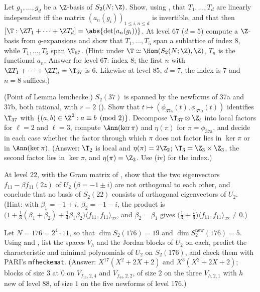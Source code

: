 \begin{exercise}\label{ex:hecke:ex-pairing33}
Let $g_1,\dots,g_d$ be a $\Z$-basis of $S_2(N;\Z)$. Show, using , that $T_1,\dots,T_d$ are linearly independent iff the matrix $(a_n(g_i))_{1\le i,n\le d}$ is
invertible, and that then $[\T:\Z T_1+\cdots+\Z T_d]=\abs{\det(a_n(g_i))}$. At level $67$ ($d=5$) compute a $\Z$-basis from $q$-expansions and show that $T_1,\dots,T_5$ span a sublattice of
index $8$, while $T_1,\dots,T_6$ span $\T_{67}$. (Hint: under $\T\simeq\Hom(S_2(N;\Z),\Z)$, $T_n$ is the functional $a_n$. Answer for level $67$: index $8$; the first $n$ with
$\Z T_1+\cdots+\Z T_n=\T_{67}$ is $6$. Likewise at level $85$, $d=7$, the index is $7$ and $n=8$ suffices.)
\end{exercise}

\begin{exercise}\label{ex:hecke:ex-local}
(Point of Lemma lem:hecke.) $S_2(37)$ is spanned by the newforms of 37a and 37b, both rational, with $r=2$ (). Show that $t\mapsto(\phi_{\text{37a}}(t),\phi_{\text{37b}}(t))$
identifies $\T_{37}$ with $\{(a,b)\in\Z^2:a\equiv b\pmod2\}$. Decompose $\T_{37}\otimes\Z_\ell$ into local factors for $\ell=2$ and $\ell=3$, compute $\Ann(\ker\pi)$ and $\eta(\pi)$ for $\pi=\phi_{\text{37a}}$, and decide in
each case whether the factor through which $\pi$ does not factor lies in $\ker\pi$ or in $\Ann(\ker\pi)$. (Answer: $\T_2$ is local and $\eta(\pi)=2\Z_2$; $\T_3=\Z_3\times\Z_3$, the second factor lies in
$\ker\pi$, and $\eta(\pi)=\Z_3$. Use (iv) for the index.)
\end{exercise}

\begin{exercise}\label{ex:hecke:ex-level22}
At level $22$, with the Gram matrix of , show that the two eigenvectors $f_{11}-\beta f_{11}(2z)$ of $U_2$ ($\beta=-1\pm i$) are not orthogonal to each other, and
conclude that no basis of $S_2(22)$ consists of orthogonal eigenvectors of $U_2$. (Hint: with $\beta_1=-1+i$, $\beta_2=-1-i$, the product is $\bigl(1+\tfrac13(\beta_1+\bar\beta_2)+\tfrac14\beta_1\bar\beta_2\bigr)\langle f_{11},f_{11}\rangle_{22}$, and $\bar\beta_2=\beta_1$ gives
$\bigl(\tfrac13+\tfrac i6\bigr)\langle f_{11},f_{11}\rangle_{22}\ne0$.)
\end{exercise}

\begin{exercise}\label{ex:hecke:ex-jordan}
Let $N=176=2^4\cdot11$, so that $\dim S_2(176)=19$ and $\dim S_2^{\mathrm{new}}(176)=5$. Using  and , list the spaces $V_h$ and the Jordan
blocks of $U_2$ on each, predict the characteristic and minimal polynomials of $U_2$ on $S_2(176)$, and check them with PARI's \texttt{mfheckemat}. (Answer: $X^{17}(X^2+2X+2)$ and $X^3(X^2+2X+2)$;
blocks of size $3$ at $0$ on $V_{f_{11},2,4}$ and $V_{f_{44},2,2}$, of size $2$ on the three $V_{h,2,1}$ with $h$ new of level $88$, of size $1$ on the five newforms of level $176$.)
\end{exercise}

